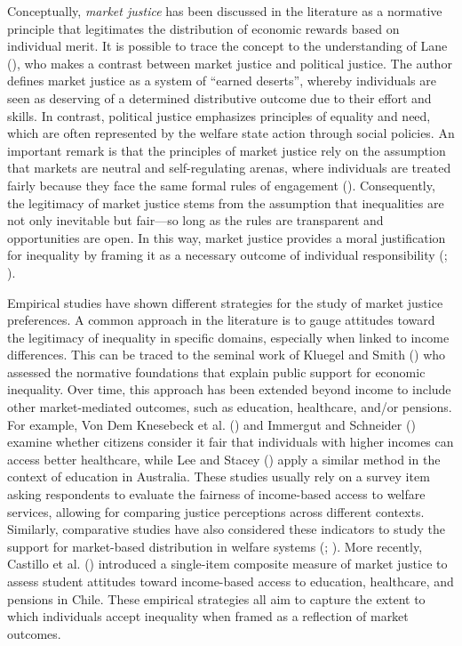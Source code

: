 \documentclass[
  12pt,
]{article}
\begin{document}
Conceptually, \emph{market justice} has been discussed in the literature
as a normative principle that legitimates the distribution of economic
rewards based on individual merit. It is possible to trace the concept
to the understanding of Lane (),
who makes a contrast between market justice and political justice. The
author defines market justice as a system of ``earned deserts'', whereby
individuals are seen as deserving of a determined distributive outcome
due to their effort and skills. In contrast, political justice
emphasizes principles of equality and need, which are often represented
by the welfare state action through social policies. An important remark
is that the principles of market justice rely on the assumption that
markets are neutral and self-regulating arenas, where individuals are
treated fairly because they face the same formal rules of engagement
(). Consequently, the
legitimacy of market justice stems from the assumption that inequalities
are not only inevitable but fair---so long as the rules are transparent
and opportunities are open. In this way, market justice provides a moral
justification for inequality by framing it as a necessary outcome of
individual responsibility
(;
).

Empirical studies have shown different strategies for the study of
market justice preferences. A common approach in the literature is to
gauge attitudes toward the legitimacy of inequality in specific domains,
especially when linked to income differences. This can be traced to the
seminal work of Kluegel and Smith
() who assessed the normative
foundations that explain public support for economic inequality. Over
time, this approach has been extended beyond income to include other
market-mediated outcomes, such as education, healthcare, and/or
pensions. For example, Von Dem Knesebeck et al.
() and Immergut and
Schneider () examine whether
citizens consider it fair that individuals with higher incomes can
access better healthcare, while Lee and Stacey
() apply a similar method in the
context of education in Australia. These studies usually rely on a
survey item asking respondents to evaluate the fairness of income-based
access to welfare services, allowing for comparing justice perceptions
across different contexts. Similarly, comparative studies have also
considered these indicators to study the support for market-based
distribution in welfare systems (; ). More
recently, Castillo et al.
() introduced a
single-item composite measure of market justice to assess student
attitudes toward income-based access to education, healthcare, and
pensions in Chile. These empirical strategies all aim to capture the
extent to which individuals accept inequality when framed as a
reflection of market outcomes.
\end{document}
